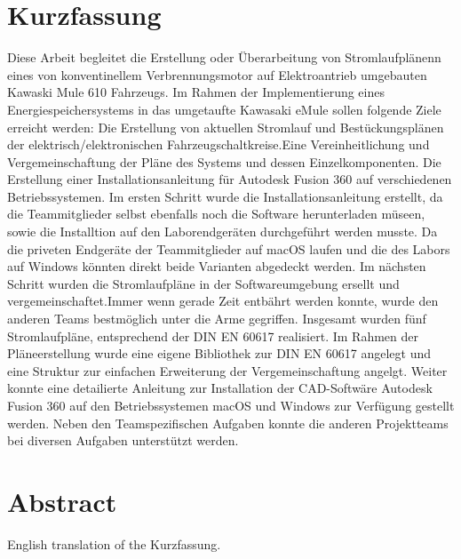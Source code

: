\chapter*{Kurzfassung} %

Diese Arbeit begleitet die Erstellung oder Überarbeitung von Stromlaufplänenn eines von konventinellem Verbrennungsmotor auf Elektroantrieb umgebauten Kawaski Mule 610 Fahrzeugs. \newline 
Im Rahmen der Implementierung eines Energiespeichersystems in das umgetaufte \glqq Kawasaki eMule \grqq sollen folgende Ziele erreicht werden: Die Erstellung von aktuellen Stromlauf und Bestückungsplänen der elektrisch/elektronischen Fahrzeugschaltkreise.Eine Vereinheitlichung und Vergemeinschaftung der Pläne des Systems und dessen Einzelkomponenten. Die Erstellung einer Installationsanleitung für Autodesk Fusion 360 auf verschiedenen Betriebssystemen.\newline
Im ersten Schritt wurde die Installationsanleitung erstellt, da die Teammitglieder selbst ebenfalls noch die Software herunterladen müseen, sowie die Installtion auf den Laborendgeräten durchgeführt werden musste. Da die priveten Endgeräte der Teammitglieder auf macOS laufen und die des Labors auf Windows könnten direkt beide Varianten abgedeckt werden. Im nächsten Schritt wurden die Stromlaufpläne in der Softwareumgebung ersellt und vergemeinschaftet.Immer wenn gerade Zeit entbährt werden konnte, wurde den anderen Teams bestmöglich unter die Arme gegriffen.\newline
Insgesamt wurden fünf Stromlaufpläne, entsprechend der DIN EN 60617 realisiert. Im Rahmen der Pläneerstellung wurde eine eigene Bibliothek zur DIN EN 60617 angelegt und eine Struktur zur einfachen Erweiterung der Vergemeinschaftung angelgt. Weiter konnte eine detailierte Anleitung zur Installation der CAD-Softwäre Autodesk Fusion 360 auf den Betriebssystemen macOS und Windows zur Verfügung gestellt werden. Neben den Teamspezifischen Aufgaben konnte die anderen Projektteams bei diversen Aufgaben unterstützt werden.

\clearpage

\chapter*{Abstract} %

English translation of the \glqq Kurzfassung\grqq.

\clearpage